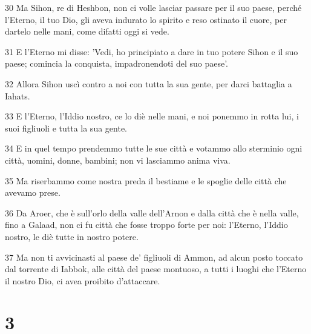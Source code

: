 \par 30 Ma Sihon, re di Heshbon, non ci volle lasciar passare per il suo paese, perché l'Eterno, il tuo Dio, gli aveva indurato lo spirito e reso ostinato il cuore, per dartelo nelle mani, come difatti oggi si vede.
\par 31 E l'Eterno mi disse: 'Vedi, ho principiato a dare in tuo potere Sihon e il suo paese; comincia la conquista, impadronendoti del suo paese'.
\par 32 Allora Sihon uscì contro a noi con tutta la sua gente, per darci battaglia a Iahats.
\par 33 E l'Eterno, l'Iddio nostro, ce lo diè nelle mani, e noi ponemmo in rotta lui, i suoi figliuoli e tutta la sua gente.
\par 34 E in quel tempo prendemmo tutte le sue città e votammo allo sterminio ogni città, uomini, donne, bambini; non vi lasciammo anima viva.
\par 35 Ma riserbammo come nostra preda il bestiame e le spoglie delle città che avevamo prese.
\par 36 Da Aroer, che è sull'orlo della valle dell'Arnon e dalla città che è nella valle, fino a Galaad, non ci fu città che fosse troppo forte per noi: l'Eterno, l'Iddio nostro, le diè tutte in nostro potere.
\par 37 Ma non ti avvicinasti al paese de' figliuoli di Ammon, ad alcun posto toccato dal torrente di Iabbok, alle città del paese montuoso, a tutti i luoghi che l'Eterno il nostro Dio, ci avea proibito d'attaccare.

\chapter{3}


